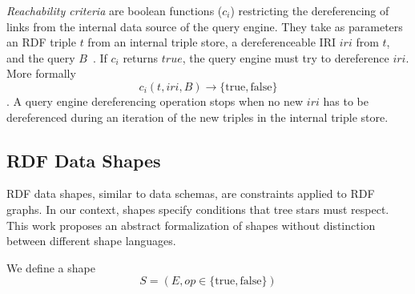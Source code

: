 \emph{Reachability criteria} are boolean functions ($c_i$) restricting the dereferencing of links from the internal data source of the query engine.
They take as parameters an RDF triple $t$ from an internal triple store, a dereferenceable IRI $iri$ from $t$, and the query $B$~\cite{Hartig2012}.
If $c_i$ returns $true$, the query engine must try to dereference $iri$.
More formally
\begin{equation}\label{eq:reachabilityCriteria}
c_i(t, iri, B) \rightarrow \{\mathrm{true}, \mathrm{false}\}
\end{equation}
.
A query engine dereferencing operation stops when no new $iri$ has to be dereferenced during an iteration of the new triples in the internal triple store.

\subsection{RDF Data Shapes}
RDF data shapes, similar to data schemas, are constraints applied to RDF graphs.
In our context, shapes specify conditions that tree stars must respect.
This work proposes an abstract formalization of shapes without distinction between different shape languages.

We define a shape
\begin{equation}
S = (E, op \in \{\mathrm{true},\mathrm{false}\})
\end{equation}

